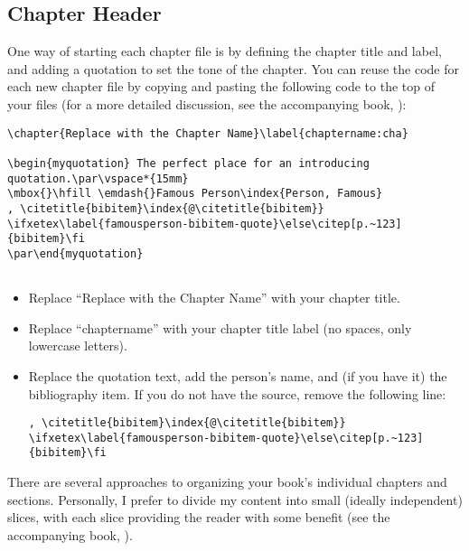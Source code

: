 \subsection{Chapter Header}

One way of starting each chapter file is by defining the chapter title and label, and adding a quotation to set the tone of the chapter. You can reuse the code for each new chapter file by copying and pasting the following code to the top of your files (for a more detailed discussion, see the accompanying book, ):

\begin{lstlisting}
\chapter{Replace with the Chapter Name}\label{chaptername:cha}

\begin{myquotation} The perfect place for an introducing quotation.\par\vspace*{15mm}
\mbox{}\hfill \emdash{}Famous Person\index{Person, Famous}
, \citetitle{bibitem}\index{@\citetitle{bibitem}} \ifxetex\label{famousperson-bibitem-quote}\else\citep[p.~123]{bibitem}\fi
\par\end{myquotation}


\end{lstlisting}


\begin{itemize}
\item Replace ``Replace with the Chapter Name'' with your chapter title.
\item Replace ``chaptername'' with your chapter title label (no spaces, only lowercase letters).
\item Replace the quotation text, add the person's name, and (if you have it) the bibliography item. If you do not have the source, remove the following line:

\begin{lstlisting}
, \citetitle{bibitem}\index{@\citetitle{bibitem}} \ifxetex\label{famousperson-bibitem-quote}\else\citep[p.~123]{bibitem}\fi
\end{lstlisting}
\end{itemize}

There are several approaches to organizing your book's individual chapters and sections. Personally, I prefer to divide my content into small (ideally independent) slices, with each slice providing the reader with some benefit (see the accompanying book, ).



